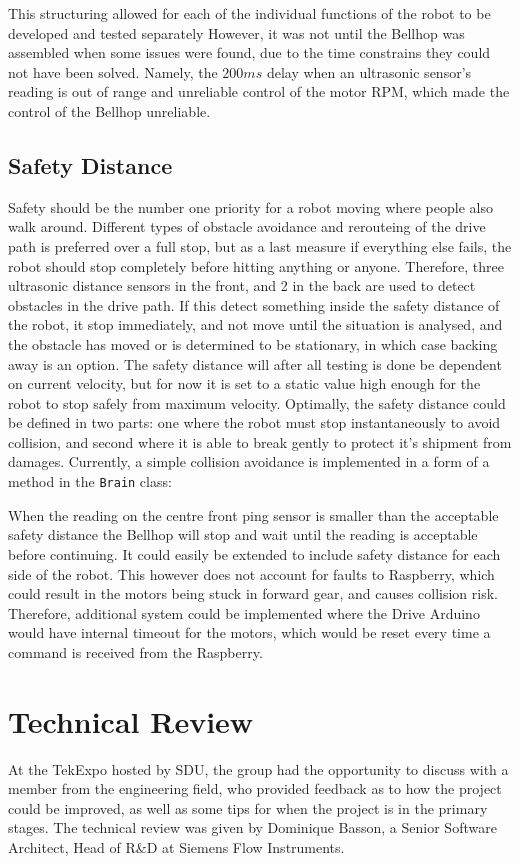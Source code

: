 \documentclass[11pt]{article}
\begin{document}
This structuring allowed for each of the individual functions of the robot to be developed and tested separately However, it was not until the Bellhop was assembled when some issues were found, due to the time constrains they could not have been solved. Namely, the $200ms$ delay when an ultrasonic sensor's reading is out of range and unreliable control of the motor RPM, which made the control of the Bellhop unreliable.

\subsection*{Safety Distance}
Safety should be the number one priority for a robot moving where people also walk around. Different types of obstacle avoidance and rerouteing of the drive path is preferred over a full stop, but as a last measure if everything else fails, the robot should stop completely before hitting anything or anyone. Therefore, three ultrasonic distance sensors in the front, and 2 in the back are used to detect obstacles in the drive path. If this detect something inside the safety distance of the robot, it stop immediately, and not move until the situation is analysed, and the obstacle has moved or is determined to be stationary, in which case backing away is an option. The safety distance will after all testing is done be dependent on current velocity, but for now it is set to a static value high enough for the robot to stop safely from maximum velocity. 
Optimally, the safety distance could be defined in two parts: one where the robot must stop instantaneously to avoid collision, and second where it is able to break gently to protect it's shipment from damages.
\goodbreak
Currently, a simple collision avoidance is implemented in a form of a method in the \texttt{Brain} class:

When the reading on the centre front ping sensor is smaller than the acceptable safety distance the Bellhop will stop and wait until the reading is acceptable before continuing. It could easily be extended to include safety distance for each side of the robot. This however does not account for faults to Raspberry, which could result in the motors being stuck in forward gear, and causes collision risk. Therefore, additional system could be implemented where the Drive Arduino would have internal timeout for the motors, which would be reset every time a command is received from the Raspberry.

\newpage
\section{Technical Review}
At the TekExpo hosted by SDU, the group had the opportunity to discuss with a member from the engineering field, who provided feedback as to how the project could be improved, as well as some tips for when the project is in the primary stages.
The technical review was given by Dominique Basson, a Senior Software Architect, Head of R\&D at Siemens Flow Instruments.
\end{document}
